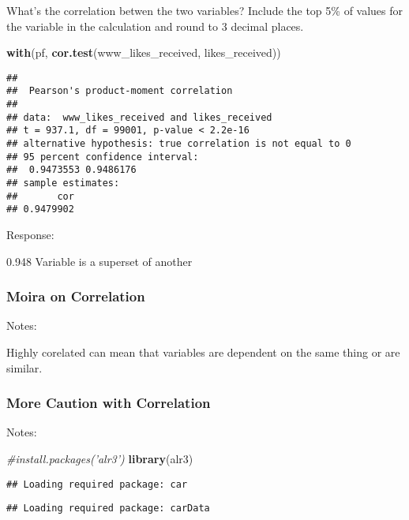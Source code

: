 \documentclass[]{article}
\newenvironment{Shaded}{\begin{snugshade}}{\end{snugshade}}
\newcommand{\KeywordTok}[1]{\textcolor[rgb]{0.13,0.29,0.53}{\textbf{#1}}}
\newcommand{\CommentTok}[1]{\textcolor[rgb]{0.56,0.35,0.01}{\textit{#1}}}
\newcommand{\NormalTok}[1]{#1}
\begin{document}
What's the correlation betwen the two variables? Include the top 5\% of
values for the variable in the calculation and round to 3 decimal
places.

\begin{Shaded}
\begin{Highlighting}[]
\KeywordTok{with}\NormalTok{(pf, }\KeywordTok{cor.test}\NormalTok{(www_likes_received, likes_received))}
\end{Highlighting}
\end{Shaded}

\begin{verbatim}
## 
##  Pearson's product-moment correlation
## 
## data:  www_likes_received and likes_received
## t = 937.1, df = 99001, p-value < 2.2e-16
## alternative hypothesis: true correlation is not equal to 0
## 95 percent confidence interval:
##  0.9473553 0.9486176
## sample estimates:
##       cor 
## 0.9479902
\end{verbatim}

Response:

0.948 Variable is a superset of another

\subsubsection{Moira on Correlation}\label{moira-on-correlation}

Notes:

Highly corelated can mean that variables are dependent on the same thing
or are similar.

\subsubsection{More Caution with
Correlation}\label{more-caution-with-correlation}

Notes:

\begin{Shaded}
\begin{Highlighting}[]
\CommentTok{#install.packages('alr3')}
\KeywordTok{library}\NormalTok{(alr3)}
\end{Highlighting}
\end{Shaded}

\begin{verbatim}
## Loading required package: car
\end{verbatim}

\begin{verbatim}
## Loading required package: carData
\end{verbatim}
\end{document}
